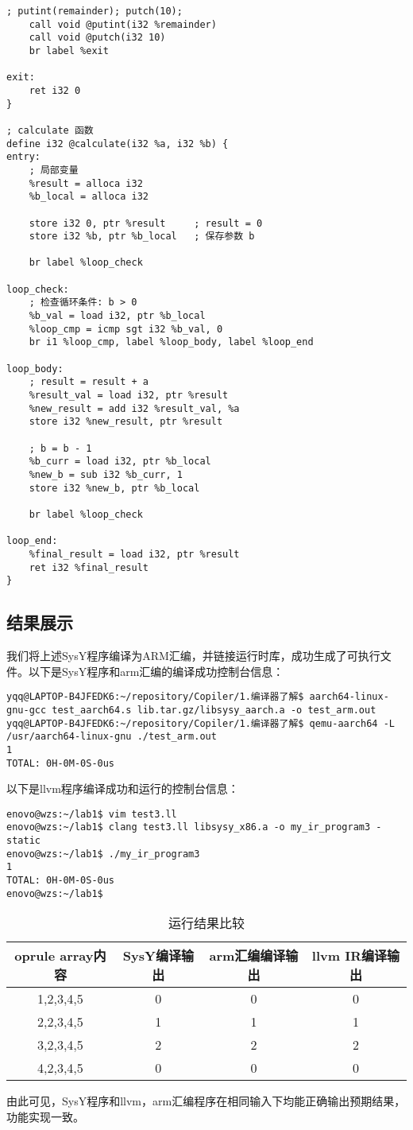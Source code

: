\documentclass[a4paper]{article}
\begin{document}
\begin{lstlisting}[language=text,caption={test\_new.ll}]
    ; putint(remainder); putch(10);
    call void @putint(i32 %remainder)
    call void @putch(i32 10)
    br label %exit

exit:
    ret i32 0
}

; calculate 函数
define i32 @calculate(i32 %a, i32 %b) {
entry:
    ; 局部变量
    %result = alloca i32
    %b_local = alloca i32
    
    store i32 0, ptr %result     ; result = 0
    store i32 %b, ptr %b_local   ; 保存参数 b
    
    br label %loop_check

loop_check:
    ; 检查循环条件: b > 0
    %b_val = load i32, ptr %b_local
    %loop_cmp = icmp sgt i32 %b_val, 0
    br i1 %loop_cmp, label %loop_body, label %loop_end

loop_body:
    ; result = result + a
    %result_val = load i32, ptr %result
    %new_result = add i32 %result_val, %a
    store i32 %new_result, ptr %result
    
    ; b = b - 1
    %b_curr = load i32, ptr %b_local
    %new_b = sub i32 %b_curr, 1
    store i32 %new_b, ptr %b_local
    
    br label %loop_check

loop_end:
    %final_result = load i32, ptr %result
    ret i32 %final_result
}

\end{lstlisting}
\subsection{结果展示}
我们将上述SysY程序编译为ARM汇编，并链接运行时库，成功生成了可执行文件。以下是SysY程序和arm汇编的编译成功控制台信息：
\begin{lstlisting}[title=运行成功信息,frame=trbl]
yqq@LAPTOP-B4JFEDK6:~/repository/Copiler/1.编译器了解$ aarch64-linux-gnu-gcc test_aarch64.s lib.tar.gz/libsysy_aarch.a -o test_arm.out
yqq@LAPTOP-B4JFEDK6:~/repository/Copiler/1.编译器了解$ qemu-aarch64 -L /usr/aarch64-linux-gnu ./test_arm.out
1
TOTAL: 0H-0M-0S-0us
\end{lstlisting}
以下是llvm程序编译成功和运行的控制台信息：
\begin{lstlisting}[title=运行成功信息,frame=trbl]
enovo@wzs:~/lab1$ vim test3.ll
enovo@wzs:~/lab1$ clang test3.ll libsysy_x86.a -o my_ir_program3 -static
enovo@wzs:~/lab1$ ./my_ir_program3
1
TOTAL: 0H-0M-0S-0us
enovo@wzs:~/lab1$
\end{lstlisting}
\begin{table}[!htbp]
  \centering
\begin{tabular}{cccc}
        oprule
    array内容 & SysY编译输出 & arm汇编编译输出 & llvm IR编译输出 \\
    \midrule
    1,2,3,4,5 & 0 & 0 & 0 \\
    2,2,3,4,5 & 1 & 1 & 1 \\
    3,2,3,4,5 & 2 & 2 & 2 \\
    4,2,3,4,5 & 0 & 0 & 0 \\
    \bottomrule
\end{tabular}
  \caption{运行结果比较}
\end{table}
由此可见，SysY程序和llvm，arm汇编程序在相同输入下均能正确输出预期结果，功能实现一致。
\end{document}
